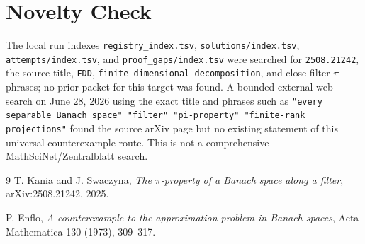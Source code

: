 \documentclass[11pt]{article}
\begin{document}
\section*{Novelty Check}

The local run indexes
\texttt{registry\_index.tsv}, \texttt{solutions/index.tsv},
\texttt{attempts/index.tsv}, and \texttt{proof\_gaps/index.tsv} were searched
for \texttt{2508.21242}, the source title, \texttt{FDD},
\texttt{finite-dimensional decomposition}, and close filter-\(\pi\) phrases;
no prior packet for this target was found.  A bounded external web search on
June 28, 2026 using the exact title and phrases such as
\texttt{"every separable Banach space" "filter" "pi-property"
"finite-rank projections"} found the source arXiv page but no existing
statement of this universal counterexample route.  This is not a comprehensive
MathSciNet/Zentralblatt search.

\begin{thebibliography}{9}
T. Kania and J. Swaczyna,
\emph{The \(\pi\)-property of a Banach space along a filter},
arXiv:2508.21242, 2025.

P. Enflo,
\emph{A counterexample to the approximation problem in Banach spaces},
Acta Mathematica 130 (1973), 309--317.
\end{thebibliography}
\end{document}
